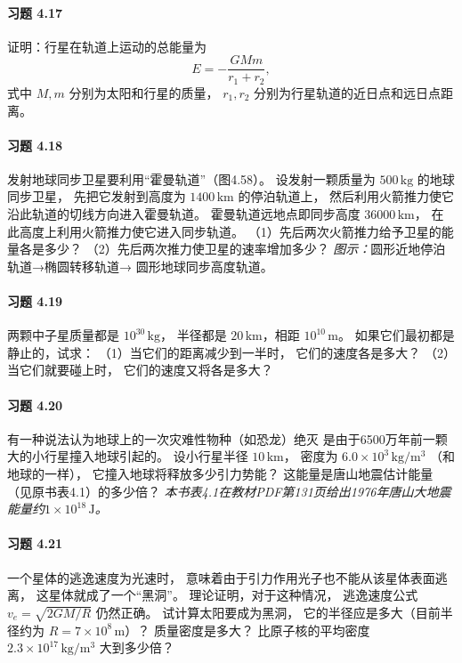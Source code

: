 \paragraph{习题 4.17}
证明：行星在轨道上运动的总能量为
\[
 E=-\frac{GMm}{r_1+r_2},
\]
式中 \(M,m\) 分别为太阳和行星的质量，
\(r_1,r_2\) 分别为行星轨道的近日点和远日点距离。

\paragraph{习题 4.18}
发射地球同步卫星要利用“霍曼轨道”（图4.58）。
设发射一颗质量为 \(500\,\mathrm{kg}\) 的地球同步卫星，
先把它发射到高度为 \(1400\,\mathrm{km}\) 的停泊轨道上，
然后利用火箭推力使它沿此轨道的切线方向进入霍曼轨道。
霍曼轨道远地点即同步高度 \(36000\,\mathrm{km}\)，
在此高度上利用火箭推力使它进入同步轨道。
（1）先后两次火箭推力给予卫星的能量各是多少？
（2）先后两次推力使卫星的速率增加多少？
\textit{图示：}圆形近地停泊轨道→椭圆转移轨道→
圆形地球同步高度轨道。

\paragraph{习题 4.19}
两颗中子星质量都是 \(10^{30}\,\mathrm{kg}\)，
半径都是 \(20\,\mathrm{km}\)，相距 \(10^{10}\,\mathrm m\)。
如果它们最初都是静止的，试求：
（1）当它们的距离减少到一半时，
它们的速度各是多大？
（2）当它们就要碰上时，
它们的速度又将各是多大？

\paragraph{习题 4.20}
有一种说法认为地球上的一次灾难性物种（如恐龙）绝灭
是由于6500万年前一颗大的小行星撞入地球引起的。
设小行星半径 \(10\,\mathrm{km}\)，
密度为 \(6.0\times10^3\,\mathrm{kg/m^3}\)
（和地球的一样），
它撞入地球将释放多少引力势能？
这能量是唐山地震估计能量（见原书表4.1）的多少倍？
\textit{本书表4.1在教材PDF第131页给出1976年唐山大地震能量约\(1\times10^{18}\,\mathrm J\)。}

\paragraph{习题 4.21}
一个星体的逃逸速度为光速时，
意味着由于引力作用光子也不能从该星体表面逃离，
这星体就成了一个“黑洞”。
理论证明，对于这种情况，
逃逸速度公式 \(v_e=\sqrt{2GM/R}\) 仍然正确。
试计算太阳要成为黑洞，
它的半径应是多大（目前半径约为
\(R=7\times10^8\,\mathrm m\)）？
质量密度是多大？
比原子核的平均密度
\(2.3\times10^{17}\,\mathrm{kg/m^3}\) 大到多少倍？

